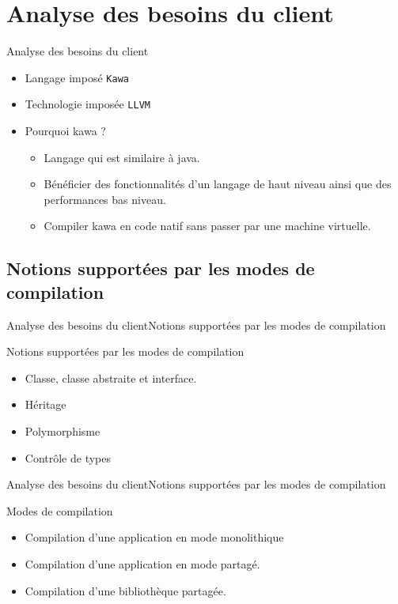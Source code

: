 \section{Analyse des besoins du client}
    \begin{frame}{Analyse des besoins du client}
      \begin{itemize}
        \item<1-> Langage imposé {\tt Kawa}
        \item<2-> Technologie imposée {\tt LLVM}
        \item<3-> Pourquoi kawa ?
          \begin{itemize}
            \item<4-> Langage qui est similaire à java.
            \item<5-> Bénéficier des fonctionnalités d'un langage de haut niveau ainsi que des performances bas niveau.
            \item<6-> Compiler kawa en code natif sans passer par une machine virtuelle.
          \end{itemize}
        
      \end{itemize}
    \end{frame}


  \subsection{Notions supportées par les modes de compilation}
    \begin{frame}{Analyse des besoins du client}{Notions supportées par les modes de compilation}
      \begin{block}{Notions supportées par les modes de compilation}
        \begin{itemize}
          \item<1-> Classe, classe abstraite et interface.
          \item<2-> Héritage
          \item<3-> Polymorphisme
          \item<4-> Contrôle de types
        \end{itemize}
      \end{block}
    \end{frame}

    \begin{frame}{Analyse des besoins du client}{Notions supportées par les modes de compilation}
      \begin{block}{Modes de compilation}
        \begin{itemize}
          \item<1-> Compilation d'une application en mode monolithique
          \item<2-> Compilation d'une application en mode partagé.
          \item<3-> Compilation d'une bibliothèque partagée.
        \end{itemize}
      \end{block}
    \end{frame}
